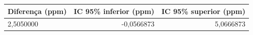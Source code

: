 \begin{tabular}{lrr}
\toprule
Diferença (ppm) & IC 95\% inferior (ppm) & IC 95\% superior (ppm) \\
\midrule
2,5050000 & -0,0566873 & 5,0666873 \\
\bottomrule
\end{tabular}
